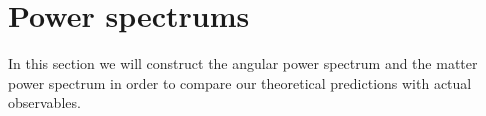 \section{Power spectrums}\label{sec:m4}

In this section we will construct the angular power spectrum and the matter power spectrum in order to compare our theoretical predictions with actual observables.




